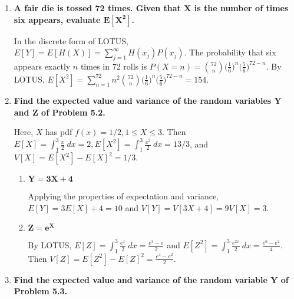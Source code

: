 \documentclass[10pt, oneside]{article}   	%
\theoremstyle{definition}
\begin{document}
\begin{enumerate}[label=7.\arabic*]
\item  \begin{tcolorbox}[
  colback=Cerulean!5!white,
  colframe=Cerulean!75!black]
  \textbf{A fair die is tossed 72 times. Given that $\bm{X}$ is the number of times six appears, evaluate $\bm{E[X^2]}$.}
  \end{tcolorbox}
  
In the discrete form of LOTUS, $E[Y] = E[H(X)] = \sum^\infty_{j=1} H(x_j) P(x_j)$. The probability that six appears exactly $n$ times in 72 rolls is $P(X = n) = \binom{72}{n} \big( \frac{1}{6} \big)^n \big( \frac{5}{6} \big)^{72-n} $. By LOTUS, $E[X^2] = \sum^{72}_{n=1} n^2 \binom{72}{n} \big( \frac{1}{6} \big)^n \big( \frac{5}{6} \big)^{72-n}  = \boxed{154}$.

\item  \begin{tcolorbox}[
  colback=Cerulean!5!white,
  colframe=Cerulean!75!black]
  \textbf{Find the expected value and variance of the random variables $\bm{Y}$ and $\bm{Z}$ of Problem 5.2.}
  \end{tcolorbox}
  
  Here, $X$ has pdf $f(x) = 1/2, 1 \leq X \leq 3$. Then $E[X] = \int^3_1 \frac{x}{2} \ dx = 2, E[X^2] = \int^3_1 \frac{x^2}{2} \ dx = 13/3 $, and $V[X] = E[X^2] -  E[X]^2 = 1/3$.
  
	\begin{enumerate}
	\item  \begin{tcolorbox}[
	  colback=Cerulean!5!white,
	  colframe=Cerulean!75!black]
	\textbf{$\bm{Y = 3X + 4}$}
	\end{tcolorbox}
	
	Applying the properties of expectation and variance, $E[Y] = 3 E[X] + 4 = \boxed{10}$ and $V[Y] = V[3X + 4] = 9 V[X] = \boxed{3}$.
	
	\item  \begin{tcolorbox}[
	  colback=Cerulean!5!white,
	  colframe=Cerulean!75!black]
	\textbf{$\bm{Z = e^X}$}
	\end{tcolorbox}
	
	By LOTUS, $E[Z] = \int^3_1 \frac{e^x}{2} \ dx = \boxed{\frac{e^3 - e}{2}}$ and $E[Z^2] = \int^3_1 \frac{e^{2x}}{2} \ dx = \frac{e^6 - e^2}{4}$. Then $V[Z] = E[Z^2] - E[Z]^2 = \boxed{\frac{e^4 - e^2}{2}}$.
	\end{enumerate}

\item  \begin{tcolorbox}[
  colback=Cerulean!5!white,
  colframe=Cerulean!75!black]
  \textbf{Find the expected value and variance of the random variable $\bm{Y}$ of Problem 5.3.}
  \end{tcolorbox}
  

\end{enumerate}
\end{document}
